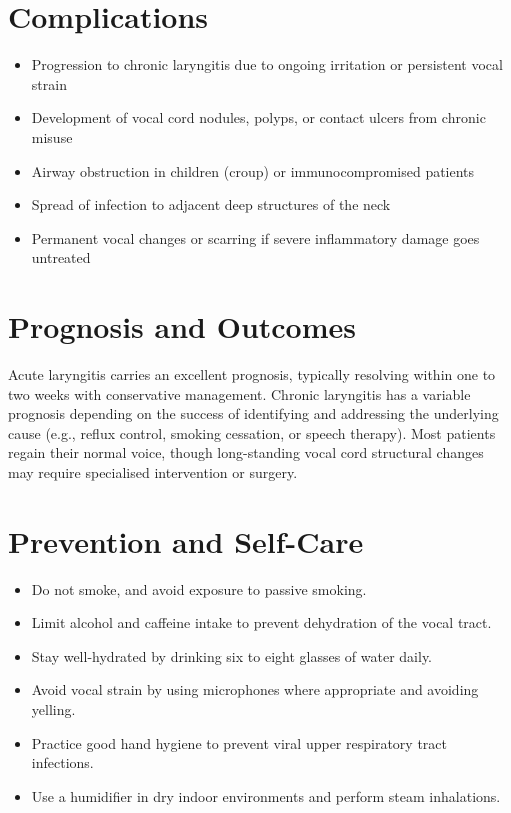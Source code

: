 \section*{Complications}
\begin{itemize}
    \item Progression to chronic laryngitis due to ongoing irritation or persistent vocal strain
    \item Development of vocal cord nodules, polyps, or contact ulcers from chronic misuse
    \item Airway obstruction in children (croup) or immunocompromised patients
    \item Spread of infection to adjacent deep structures of the neck
    \item Permanent vocal changes or scarring if severe inflammatory damage goes untreated
\end{itemize}

\section*{Prognosis and Outcomes}
Acute laryngitis carries an excellent prognosis, typically resolving within one to two weeks with conservative management. Chronic laryngitis has a variable prognosis depending on the success of identifying and addressing the underlying cause (e.g., reflux control, smoking cessation, or speech therapy). Most patients regain their normal voice, though long-standing vocal cord structural changes may require specialised intervention or surgery.

\section*{Prevention and Self-Care}
\begin{itemize}
    \item Do not smoke, and avoid exposure to passive smoking.
    \item Limit alcohol and caffeine intake to prevent dehydration of the vocal tract.
    \item Stay well-hydrated by drinking six to eight glasses of water daily.
    \item Avoid vocal strain by using microphones where appropriate and avoiding yelling.
    \item Practice good hand hygiene to prevent viral upper respiratory tract infections.
    \item Use a humidifier in dry indoor environments and perform steam inhalations.
\end{itemize}

